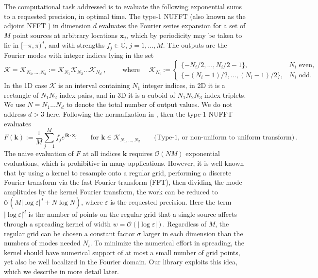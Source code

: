 \documentclass[10pt]{article}
\newcommand{\be}{\begin{equation}}
\newcommand{\ee}{\end{equation}}
\newcommand{\mbf}[1]{{\mathbf #1}}
\newcommand{\eps}{\varepsilon}
\newcommand{\bigO}{{\mathcal O}}
\newcommand{\xx}{\mbf{x}}
\newcommand{\kk}{\mbf{k}}
\newcommand{\KK}{{\mathcal K}}
\newcommand{\NU}{{non-uniform}}
\newcommand{\U}{{uniform}}
\newcommand{\rat}{\sigma}          %
\begin{document}
The computational task addressed
is to evaluate the following exponential sums to a requested precision,
in optimal time.
The type-1 NUFFT (also known as the adjoint NFFT \cite{usingnfft})
in dimension $d$ %
evaluates the Fourier series expansion for a set of
$M$ point sources at arbitrary locations $\xx_j$, which by periodicity
may be taken to lie in $[-\pi,\pi)^d$, and with
strengths $f_j\in\mathbb{C}$,  $j=1,\dots,M$.
The outputs are the Fourier modes with integer indices lying in
the set
\be
\KK = \KK_{N_1,\dots,N_d} := \KK_{N_1} \KK_{N_2} \dots \KK_{N_d}~,
\qquad\mbox{ where } \quad
\KK_{N_i} := \left\{\begin{array}{ll} \{-N_i/2,\ldots,N_i/2-1\}, & N_i \mbox{ even},\\
\{-(N_i-1)/2,\ldots,(N_i-1)/2\}, & N_i \mbox{ odd}.
\end{array}\right.
\label{KK}
\ee
In the 1D case $\KK$ is an interval containing $N_1$ integer indices, in 2D it is a rectangle of $N_1N_2$ index pairs, and in 3D it is a cuboid of $N_1N_2N_3$ index triplets.
We use $N=N_1\dots N_d$ to denote the total number of output values.
We do not address $d>3$ here.
Following the normalization in \cite{dutt,nufft}, then the type-1 NUFFT
evaluates
\be
F(\kk) := \frac{1}{M} \sum_{j=1}^M f_j e^{i \kk\cdot \xx_j}
\qquad \mbox{for } \kk \in \KK_{N_1,\dots,N_d}
\qquad \mbox{(Type-1, or \NU\ to \U\ transform)}
~.
\label{1}
\ee
The naive evaluation of $F$ at all indices $\kk$ requires $\bigO(NM)$
exponential evaluations, which is prohibitive
in many applications.
However, it is well known that by using a kernel to resample onto a regular
grid, performing a discrete Fourier transform via the fast Fourier transform
(FFT), then dividing the mode amplitudes by the kernel Fourier transform,
the work can be reduced to $\bigO(M |\log\eps|^d + N \log N)$,
where $\eps$ is the requested precision.
Here the term $|\log\eps|^d$ is the number of points on the regular
grid that a single source affects through a spreading kernel
of width $w=\bigO(|\log\eps|)$.
Regardless of $M$, the regular grid can be chosen a constant factor
$\rat$ larger in each dimension than the numbers of modes needed $N_i$.
To minimize the numerical effort in spreading, the kernel should have
numerical support of at most a small number of grid points,
yet also be well localized in the Fourier domain.
Our library exploits this idea, which we describe in more detail later.
\end{document}
